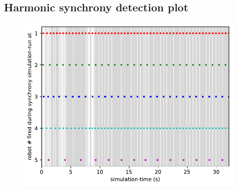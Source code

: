 	\subsection{Harmonic synchrony detection plot}
	\begin{figure}
		\centering
		\includegraphics[width=\linewidth]{Assets/DocSegments/Chapters/ExperimentsAndResults/Figures/Explanations/HarmonicSynchronyDetectionPlot.pdf}

\end{figure}
